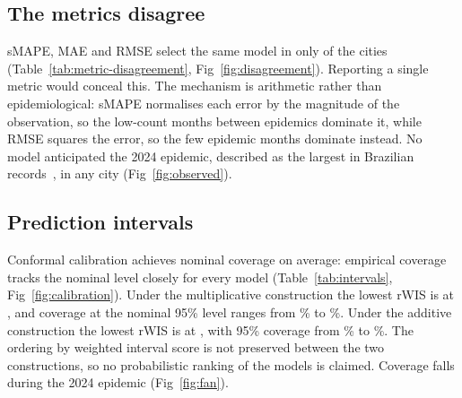 \documentclass[10pt,letterpaper]{article}
\begin{document}
{

\subsection*{The metrics disagree}

sMAPE, MAE and RMSE select the same model in only  of the  cities (Table~\ref{tab:metric-disagreement}, Fig~\ref{fig:disagreement}). Reporting a single metric would conceal this. The mechanism is arithmetic rather than epidemiological: sMAPE normalises each error by the magnitude of the observation, so the low-count months between epidemics dominate it, while RMSE squares the error, so the few epidemic months dominate instead. No model anticipated the 2024 epidemic, described as the largest in Brazilian records~\cite{GurgelGoncalves2024}, in any city (Fig~\ref{fig:observed}).





\subsection*{Prediction intervals}

Conformal calibration achieves nominal coverage on average: empirical coverage tracks the nominal level closely for every model (Table~\ref{tab:intervals}, Fig~\ref{fig:calibration}). Under the multiplicative construction the lowest rWIS is  at , and coverage at the nominal 95\% level ranges from \% to \%. Under the additive construction the lowest rWIS is  at , with 95\% coverage from \% to \%. The ordering by weighted interval score is not preserved between the two constructions, so no probabilistic ranking of the models is claimed. Coverage falls during the 2024 epidemic (Fig~\ref{fig:fan}).

}
\end{document}
